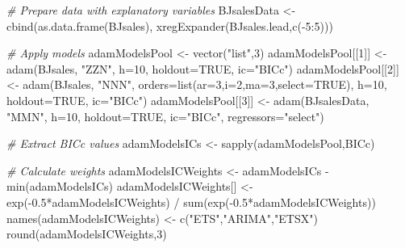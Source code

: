 \documentclass[
]{book}
\newenvironment{Shaded}{\begin{snugshade}}{\end{snugshade}}
\newcommand{\AttributeTok}[1]{\textcolor[rgb]{0.77,0.63,0.00}{#1}}
\newcommand{\CommentTok}[1]{\textcolor[rgb]{0.56,0.35,0.01}{\textit{#1}}}
\newcommand{\ConstantTok}[1]{\textcolor[rgb]{0.00,0.00,0.00}{#1}}
\newcommand{\DecValTok}[1]{\textcolor[rgb]{0.00,0.00,0.81}{#1}}
\newcommand{\FloatTok}[1]{\textcolor[rgb]{0.00,0.00,0.81}{#1}}
\newcommand{\FunctionTok}[1]{\textcolor[rgb]{0.00,0.00,0.00}{#1}}
\newcommand{\NormalTok}[1]{#1}
\newcommand{\OtherTok}[1]{\textcolor[rgb]{0.56,0.35,0.01}{#1}}
\newcommand{\SpecialCharTok}[1]{\textcolor[rgb]{0.00,0.00,0.00}{#1}}
\newcommand{\StringTok}[1]{\textcolor[rgb]{0.31,0.60,0.02}{#1}}
\theoremstyle{definition}
\theoremstyle{definition}
\theoremstyle{definition}
\theoremstyle{definition}
\theoremstyle{remark}
\begin{document}
\begin{Shaded}
\begin{Highlighting}[]
\CommentTok{\# Prepare data with explanatory variables}
\NormalTok{BJsalesData }\OtherTok{\textless{}{-}} \FunctionTok{cbind}\NormalTok{(}\FunctionTok{as.data.frame}\NormalTok{(BJsales),}
                     \FunctionTok{xregExpander}\NormalTok{(BJsales.lead,}\FunctionTok{c}\NormalTok{(}\SpecialCharTok{{-}}\DecValTok{5}\SpecialCharTok{:}\DecValTok{5}\NormalTok{)))}

\CommentTok{\# Apply models}
\NormalTok{adamModelsPool }\OtherTok{\textless{}{-}} \FunctionTok{vector}\NormalTok{(}\StringTok{"list"}\NormalTok{,}\DecValTok{3}\NormalTok{)}
\NormalTok{adamModelsPool[[}\DecValTok{1}\NormalTok{]] }\OtherTok{\textless{}{-}} \FunctionTok{adam}\NormalTok{(BJsales, }\StringTok{"ZZN"}\NormalTok{,}
                            \AttributeTok{h=}\DecValTok{10}\NormalTok{, }\AttributeTok{holdout=}\ConstantTok{TRUE}\NormalTok{,}
                            \AttributeTok{ic=}\StringTok{"BICc"}\NormalTok{)}
\NormalTok{adamModelsPool[[}\DecValTok{2}\NormalTok{]] }\OtherTok{\textless{}{-}} \FunctionTok{adam}\NormalTok{(BJsales, }\StringTok{"NNN"}\NormalTok{,}
                            \AttributeTok{orders=}\FunctionTok{list}\NormalTok{(}\AttributeTok{ar=}\DecValTok{3}\NormalTok{,}\AttributeTok{i=}\DecValTok{2}\NormalTok{,}\AttributeTok{ma=}\DecValTok{3}\NormalTok{,}\AttributeTok{select=}\ConstantTok{TRUE}\NormalTok{),}
                            \AttributeTok{h=}\DecValTok{10}\NormalTok{, }\AttributeTok{holdout=}\ConstantTok{TRUE}\NormalTok{,}
                            \AttributeTok{ic=}\StringTok{"BICc"}\NormalTok{)}
\NormalTok{adamModelsPool[[}\DecValTok{3}\NormalTok{]] }\OtherTok{\textless{}{-}} \FunctionTok{adam}\NormalTok{(BJsalesData, }\StringTok{"MMN"}\NormalTok{,}
                            \AttributeTok{h=}\DecValTok{10}\NormalTok{, }\AttributeTok{holdout=}\ConstantTok{TRUE}\NormalTok{,}
                            \AttributeTok{ic=}\StringTok{"BICc"}\NormalTok{,}
                            \AttributeTok{regressors=}\StringTok{"select"}\NormalTok{)}

\CommentTok{\# Extract BICc values}
\NormalTok{adamModelsICs }\OtherTok{\textless{}{-}} \FunctionTok{sapply}\NormalTok{(adamModelsPool,BICc)}

\CommentTok{\# Calculate weights}
\NormalTok{adamModelsICWeights }\OtherTok{\textless{}{-}}\NormalTok{ adamModelsICs }\SpecialCharTok{{-}} \FunctionTok{min}\NormalTok{(adamModelsICs)}
\NormalTok{adamModelsICWeights[] }\OtherTok{\textless{}{-}} \FunctionTok{exp}\NormalTok{(}\SpecialCharTok{{-}}\FloatTok{0.5}\SpecialCharTok{*}\NormalTok{adamModelsICWeights) }\SpecialCharTok{/}
    \FunctionTok{sum}\NormalTok{(}\FunctionTok{exp}\NormalTok{(}\SpecialCharTok{{-}}\FloatTok{0.5}\SpecialCharTok{*}\NormalTok{adamModelsICWeights))}
\FunctionTok{names}\NormalTok{(adamModelsICWeights) }\OtherTok{\textless{}{-}} \FunctionTok{c}\NormalTok{(}\StringTok{"ETS"}\NormalTok{,}\StringTok{"ARIMA"}\NormalTok{,}\StringTok{"ETSX"}\NormalTok{)}
\FunctionTok{round}\NormalTok{(adamModelsICWeights,}\DecValTok{3}\NormalTok{)}
\end{Highlighting}
\end{Shaded}
\end{document}
